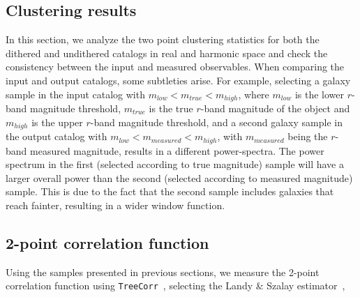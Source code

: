 \documentclass[twocolumn]{aastex62}
\begin{document}
\subsection{Clustering results}
\label{sec:results}

In this section, we analyze the two point clustering statistics for both the dithered and undithered catalogs in real and harmonic space and check the consistency between the input and measured observables. When comparing the input and output catalogs, some subtleties arise. For example, selecting a galaxy sample in the input catalog with $m_{low} < m_{true} < m_{high}$, where $m_{low}$ is the lower $r$-band magnitude threshold, $m_{true}$ is the true $r$-band magnitude of the object and $m_{high}$ is the upper $r$-band magnitude threshold, and a second galaxy sample in the output catalog with $m_{low} < m_{measured} < m_{high}$, with $m_{measured}$ being the $r$-band measured magnitude, results in a different power-spectra. The power spectrum in the first (selected according to true magnitude) sample will have a larger overall power than the second (selected according to measured magnitude) sample. This is due to the fact that the second sample includes galaxies that reach fainter, resulting in a wider window function. 

\subsection{2-point correlation function}
Using the samples presented in previous sections, we measure the 2-point correlation function using \texttt{TreeCorr}~\citep{2004MNRAS.352..338J}, selecting the Landy \& Szalay estimator~\citep{1993ApJ...412...64L},
\end{document}
